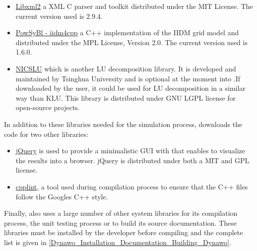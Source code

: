 \documentclass[a4paper, 12pt]{report}
\begin{document}
\begin{itemize}
\item \href{http://xmlsoft.org/}{\underline{Libxml2}} a XML C parser and toolkit distributed under the MIT License. The current version used is 2.9.4.

\item \href{https://www.powsybl.org/pages/documentation/developer/repositories/powsybl-iidm4cpp.html}{\underline{PowSyBl - iidm4cpp}} a C++ implementation of the IIDM grid model and distributed under the MPL License, Version 2.0. The current version used is 1.6.0.

\item \href{http://nicslu.weebly.com/} {\underline{NICSLU}} \cite{chenNicsLu} which is another LU decomposition library. It is developed and maintained by Tsinghua University and is optional at the moment into \Dynawo .If downloaded by the user, it could be used for LU decomposition in a similar way than KLU. This library is distributed under GNU LGPL license for open-source projects.
\end{itemize}

In addition to these libraries needed for the simulation process, \Dynawo downloads the code for two other libraries:
\begin{itemize}
\item \href{https://jquery.com/}{\underline{jQuery}} is used to provide a minimalistic GUI with \Dynawo that enables to visualize the results into a browser. jQuery is distributed under both a MIT and GPL license.
\item \href{https://github.com/google/styleguide/tree/gh-pages/cpplint}{\underline{cpplint}}, a tool used during \Dynawo compilation process to ensure that the C++ files follow the Google\textquotesingle s C++ style.
\end{itemize}

Finally, \Dynawo also uses a large number of other system libraries for its compilation process, the unit testing process or to build its source documentation. These libraries must be installed by the developer before compiling \Dynawo and the complete list is given in \ref{Dynawo_Installation_Documentation_Building_Dynawo}.



\end{document}
